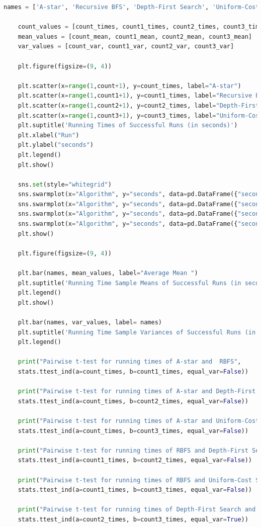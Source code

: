 \documentclass{article}
\begin{document}
\begin{lstlisting}[language=Python, caption=Full Code Listing]
	names = ['A-star', 'Recursive BFS', 'Depth-First Search', 'Uniform-Cost Search']
	
	count_values = [count_times, count1_times, count2_times, count3_times]
	mean_values = [count_mean, count1_mean, count2_mean, count3_mean]
	var_values = [count_var, count1_var, count2_var, count3_var]
	
	plt.figure(figsize=(9, 4))
	
	plt.scatter(x=range(1,count+1), y=count_times, label="A-star")
	plt.scatter(x=range(1,count1+1), y=count1_times, label="Recursive BFS")
	plt.scatter(x=range(1,count2+1), y=count2_times, label="Depth-First Search")
	plt.scatter(x=range(1,count3+1), y=count3_times, label="Uniform-Cost Search")
	plt.suptitle('Running Times of Successful Runs (in seconds)')
	plt.xlabel("Run")
	plt.ylabel("seconds")
	plt.legend()
	plt.show()
		
	sns.set(style="whitegrid")	
	sns.swarmplot(x="Algorithm", y="seconds", data=pd.DataFrame({"seconds": count_values[0],"Algorithm": names[0]}), size=6, hue='Algorithm')
	sns.swarmplot(x="Algorithm", y="seconds", data=pd.DataFrame({"seconds": count_values[1],"Algorithm": names[1]}), size=6, hue='Algorithm')
	sns.swarmplot(x="Algorithm", y="seconds", data=pd.DataFrame({"seconds": count_values[2],"Algorithm": names[2]}), size=6, hue='Algorithm')
	sns.swarmplot(x="Algorithm", y="seconds", data=pd.DataFrame({"seconds": count_values[3],"Algorithm": names[3]}), size=6, hue='Algorithm')
	plt.show()
		
	plt.figure(figsize=(9, 4))
	
	plt.bar(names, mean_values, label="Average Mean ")
	plt.suptitle('Running Time Sample Means of Successful Runs (in seconds)')
	plt.legend()
	plt.show()
	
	plt.bar(names, var_values, label= names)
	plt.suptitle('Running Time Sample Variances of Successful Runs (in seconds)')
	plt.legend()
	
	print("Pairwise t-test for running times of A-star and  RBFS",
	stats.ttest_ind(a=count_times, b=count1_times, equal_var=False))
	
	print("Pairwise t-test for running times of A-star and Depth-First Search:",
	stats.ttest_ind(a=count_times, b=count2_times, equal_var=False))
	
	print("Pairwise t-test for running times of A-star and Uniform-Cost Search:", 
	stats.ttest_ind(a=count_times, b=count3_times, equal_var=False))
	
	print("Pairwise t-test for running times of RBFS and Depth-First Search:", 
	stats.ttest_ind(a=count1_times, b=count2_times, equal_var=False))
	
	print("Pairwise t-test for running times of RBFS and Uniform-Cost Search:", 
	stats.ttest_ind(a=count1_times, b=count3_times, equal_var=False))
	
	print("Pairwise t-test for running times of Depth-First Search and Uniform-Cost Search:", 
	stats.ttest_ind(a=count2_times, b=count3_times, equal_var=True))
	
\end{lstlisting}
\end{document}
